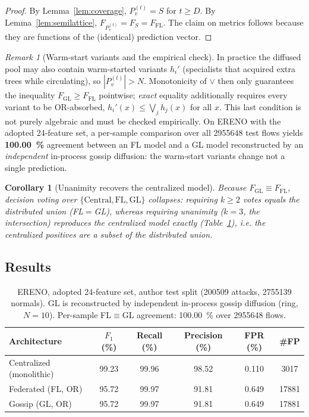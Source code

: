 \documentclass[11pt]{article}
\newtheorem{corollary}{Corollary}
\theoremstyle{remark}
\newtheorem{remark}{Remark}
\newcommand{\Fset}{F}
\begin{document}
\begin{proof}
By Lemma~\ref{lem:coverage}, $P_v^{(t)}=S$ for $t\ge D$. By
Lemma~\ref{lem:semilattice}, $\Fset_{P_v^{(t)}}=\Fset_{S}=\Fset_{\mathrm{FL}}$.
The claim on metrics follows because they are functions of the (identical)
prediction vector.
\end{proof}

\begin{remark}[Warm-start variants and the empirical check]
In practice the diffused pool may also contain warm-started variants $h_i'$
(specialists that acquired extra trees while circulating), so
$|P_v^{(t)}|>N$. Monotonicity of $\vee$ then only guarantees the inequality
$\Fset_{\mathrm{GL}}\ge\Fset_{\mathrm{FL}}$ pointwise; \emph{exact} equality
additionally requires every variant to be OR-absorbed,
$h_i'(x)\le\bigvee_{j}h_j(x)$ for all $x$. This last condition is not purely
algebraic and must be checked empirically. On ERENO with the adopted 24-feature
set, a per-sample comparison over all \num{2955648} test flows yields
\textbf{\SI{100.00}{\percent}} agreement between an FL model and a GL model
reconstructed by an \emph{independent} in-process gossip diffusion: the
warm-start variants change not a single prediction.
\end{remark}

\begin{corollary}[Unanimity recovers the centralized model]
Because $\Fset_{\mathrm{GL}}\equiv\Fset_{\mathrm{FL}}$, decision voting over
$\{\text{Central},\mathrm{FL},\mathrm{GL}\}$ collapses: requiring
$k\ge 2$ votes equals the distributed union (FL$=$GL), whereas requiring
unanimity ($k=3$, the intersection) reproduces the centralized model exactly
(Table~\ref{tab:glfl-results}), i.e. the centralized positives are a subset of
the distributed union.
\end{corollary}

\subsection{Results}

\begin{table}[t]
  \centering
  \caption{ERENO, adopted 24-feature set, author test split
    (\num{200509} attacks, \num{2755139} normals). GL is reconstructed by
    independent in-process gossip diffusion (ring, $N=10$). Per-sample
    FL$\equiv$GL agreement: \SI{100.00}{\percent} over \num{2955648} flows.}
  \label{tab:glfl-results}
  \begin{tabular}{lccccc}
    \toprule
    Architecture & $F_1$ (\%) & Recall (\%) & Precision (\%) & FPR (\%) & \#FP \\
    \midrule
    Centralized (monolithic) & 99.23 & 99.96 & 98.52 & 0.110 & \num{3017} \\
    Federated (FL, OR)        & 95.72 & 99.97 & 91.81 & 0.649 & \num{17881} \\
    Gossip (GL, OR)           & 95.72 & 99.97 & 91.81 & 0.649 & \num{17881} \\
    \bottomrule
  \end{tabular}
\end{table}
\end{document}
